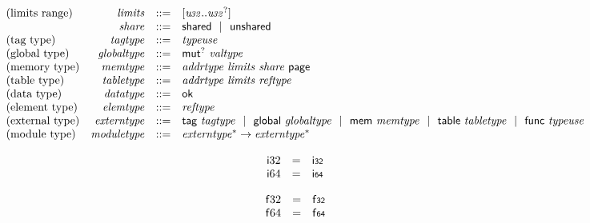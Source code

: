 \vspace{1ex}

$$
\begin{array}[t]{@{}lrrl@{}l@{}}
\mbox{(limits range)} & {\mathit{limits}} & ::= & {}[ {\mathit{u{\kern-0.1em\scriptstyle 32}}} .. {{\mathit{u{\kern-0.1em\scriptstyle 32}}}^?} ] \\
& {\mathit{share}} & ::= & \mathsf{shared} ~~|~~ \mathsf{unshared} \\
\mbox{(tag type)} & {\mathit{tagtype}} & ::= & {\mathit{typeuse}} \\
\mbox{(global type)} & {\mathit{globaltype}} & ::= & {\mathsf{mut}^?}~{\mathit{valtype}} \\
\mbox{(memory type)} & {\mathit{memtype}} & ::= & {\mathit{addrtype}}~{\mathit{limits}}~{\mathit{share}}~\mathsf{page} \\
\mbox{(table type)} & {\mathit{tabletype}} & ::= & {\mathit{addrtype}}~{\mathit{limits}}~{\mathit{reftype}} \\
\mbox{(data type)} & {\mathit{datatype}} & ::= & \mathsf{ok} \\
\mbox{(element type)} & {\mathit{elemtype}} & ::= & {\mathit{reftype}} \\
\mbox{(external type)} & {\mathit{externtype}} & ::= & \mathsf{tag}~{\mathit{tagtype}} ~~|~~ \mathsf{global}~{\mathit{globaltype}} ~~|~~ \mathsf{mem}~{\mathit{memtype}} ~~|~~ \mathsf{table}~{\mathit{tabletype}} ~~|~~ \mathsf{func}~{\mathit{typeuse}} \\
\mbox{(module type)} & {\mathit{moduletype}} & ::= & {{\mathit{externtype}}^\ast} \rightarrow {{\mathit{externtype}}^\ast} \\
\end{array}
$$

\vspace{1ex}

\vspace{1ex}

$$
\begin{array}[t]{@{}lcl@{}l@{}}
{\mathsf{i}}{32} & = & \mathsf{i{\scriptstyle 32}} \\
{\mathsf{i}}{64} & = & \mathsf{i{\scriptstyle 64}} \\
\end{array}
$$

$$
\begin{array}[t]{@{}lcl@{}l@{}}
{\mathsf{f}}{32} & = & \mathsf{f{\scriptstyle 32}} \\
{\mathsf{f}}{64} & = & \mathsf{f{\scriptstyle 64}} \\
\end{array}
$$

